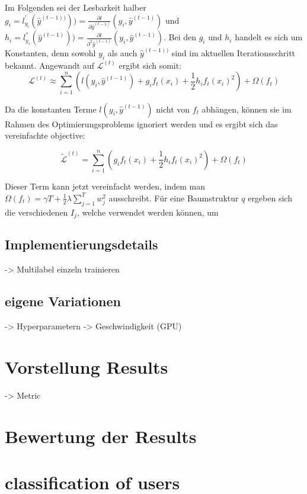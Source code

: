 \documentclass[a4paper,12pt]{scrartcl}
\newcommand{\LL}{\ensuremath{\mathcal{L}}}
\begin{document}
Im Folgenden sei der Lesbarkeit halber $g_i = l_{y_i}^{'}(\hat{y}^{(t-1))}) ) = \frac{\partial l}{\partial \hat{y}^{(t-1)}}(y_i,\hat{y}^{(t-1)})$ und $h_i = l_{y_i}^{''}(\hat{y}^{(t-1)}) ) = \frac{\partial l}{\partial^2 \hat{y}^{(t-1)}}(y_i,\hat{y}^{(t-1)})$. Bei den $g_i$ und $h_i$ handelt es sich um Konstanten, denn sowohl $y_i$ als auch $\hat{y}^{(t-1))}$ sind im aktuellen Iterationsschritt bekannt. Angewandt auf $\LL^{(t)}$ ergibt sich somit:
\begin{equation}
	 \LL^{(t)} \approx \sum_{i=1}^{n} (l(y_i,\hat{y}^{(t-1)}) + g_if_t(x_i) + \frac{1}{2} h_i f_t(x_i)^2) + \Omega(f_t)
\end{equation}

Da die konstanten Terme $l(y_i,\hat{y}^{(t-1)})$ nicht von $f_t$ abhängen, können sie im Rahmen des Optimierungsproblems ignoriert werden und es ergibt sich das vereinfachte objective:

\begin{equation}
\tilde{\LL}^{(t)} = \sum_{i=1}^{n}( g_if_t(x_i) + \frac{1}{2} h_i f_t(x_i)^2) + \Omega(f_t)
\end{equation}

Dieser Term kann jetzt vereinfacht werden, indem man $\Omega(f_t) = \gamma T + \frac{1}{2}\lambda \sum_{j=1}^{T} w_j^2$ ausschreibt. Für eine Baumstruktur $q$ ergeben sich die verschiedenen $I_j$, welche verwendet werden können, um 


\subsection{Implementierungsdetails}
-> Multilabel einzeln trainieren

\subsection{eigene Variationen}
-> Hyperparametern
-> Geschwindigkeit (GPU)


\section{Vorstellung Results}
-> Metric

\section{Bewertung der Results}

\section{classification of users}
\end{document}
